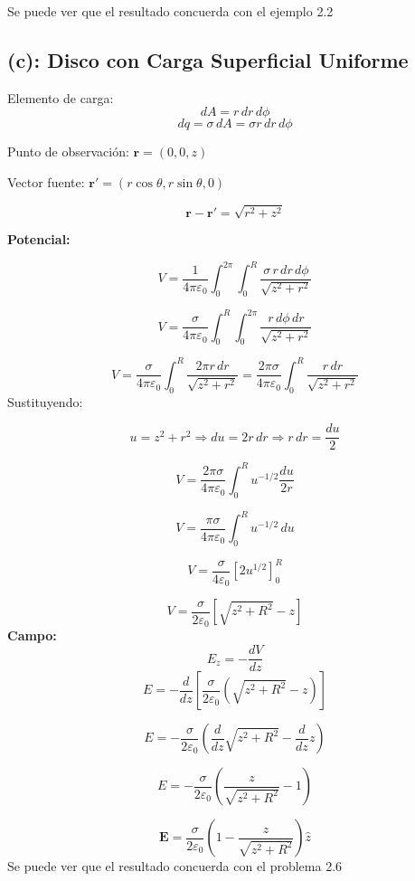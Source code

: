 \documentclass[12pt,letterpaper]{article}
\begin{document}
Se puede ver que el resultado concuerda con el ejemplo 2.2

\subsection*{(c): Disco con Carga Superficial Uniforme}


Elemento de carga:
\[
dA = r\,dr\,d\phi
\]
\[
dq = \sigma \, dA = \sigma  r\,dr\,d\phi
\]

Punto de observación: \(\mathbf{r} = (0, 0, z)\)

Vector fuente: \(\mathbf{r}' = (r \cos\theta, r \sin\theta, 0)\)

\[
{\mathbf{r} - \mathbf{r}'} = \sqrt{r^2 + z^2}
\]

\textbf{Potencial:}

\[
V = \frac{1}{4\pi\varepsilon_0} \int_0^{2\pi} \int_0^R \frac{\sigma\, r\, dr\, d\phi}{\sqrt{z^2 + r^2}}
\]

\[
V = \frac{\sigma}{4\pi\varepsilon_0} \int_0^R \int_0^{2\pi} \frac{r\, d\phi\, dr}{\sqrt{z^2 + r^2}}
\]

\[
V = \frac{\sigma}{4\pi\varepsilon_0} \int_0^R \frac{2\pi r\, dr}{\sqrt{z^2 + r^2}}
= \frac{2\pi\sigma}{4\pi\varepsilon_0} \int_0^R \frac{r\, dr}{\sqrt{z^2 + r^2}}
\]
Sustituyendo:

\[
u = z^2 + r^2 \Rightarrow du = 2r\, dr \Rightarrow r\, dr = \frac{du}{2}
\]

\[
V = \frac{2\pi\sigma}{4\pi\varepsilon_0} \int_0^R u^{-1/2} \frac{du}{2r}
\]

\[
V = \frac{\pi \sigma}{4\pi \varepsilon_0} \int_0^R u^{-1/2} \, du
\]

\[
V = \frac{\sigma}{4\varepsilon_0} \left[ 2u^{1/2} \right]_0^{R}
\]

\[
V = \frac{\sigma}{2\varepsilon_0} \left[ \sqrt{z^2 + R^2} - z \right]
\]
\textbf{Campo:}
\[
E_z = -\frac{dV}{dz}
\]
\[
E = -\frac{d}{dz} \left[ \frac{\sigma}{2\varepsilon_0} \left( \sqrt{z^2 + R^2} - z \right) \right]
\]

\[
E = -\frac{\sigma}{2\varepsilon_0} \left( \frac{d}{dz} \sqrt{z^2 + R^2} - \frac{d}{dz} z \right)
\]

\[
E = -\frac{\sigma}{2\varepsilon_0} \left( \frac{z}{\sqrt{z^2 + R^2}} - 1 \right)
\]

\[
\mathbf{E} = \frac{\sigma}{2\varepsilon_0} \left( 1 - \frac{z}{\sqrt{z^2 + R^2}} \right) \hat{z}
\]
Se puede ver que el resultado concuerda con el problema 2.6

\end{document}
